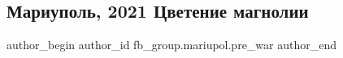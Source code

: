  
 
 
 
 

\subsection{Мариуполь, 2021  Цветение магнолии}
\label{sec:05_02_2023.fb.fb_group.mariupol.pre_war.3.mariupol__2021__tsve}

\ifcmt
 author_begin
   author_id fb_group.mariupol.pre_war
 author_end
\fi
